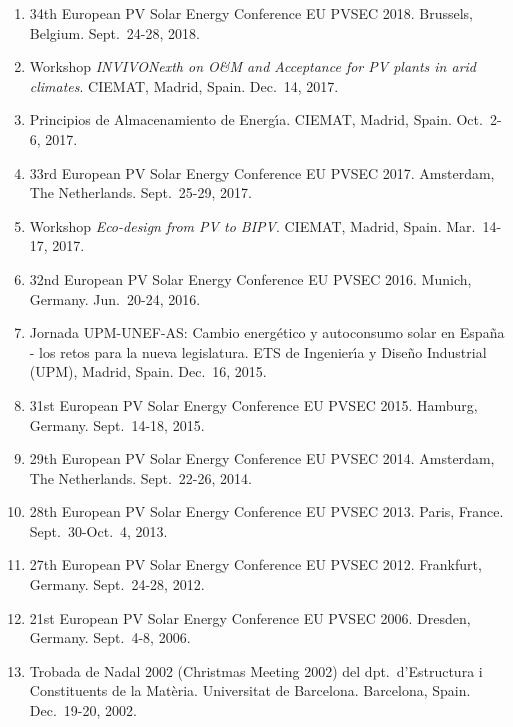 \documentclass{article}
\begin{document}
\begin{enumerate}
\item
34th European PV Solar Energy Conference EU PVSEC 2018.
Brussels, Belgium.
Sept.~24-28, 2018.

\item
Workshop {\it INVIVONexth on O\&M and Acceptance for PV plants in arid climates}.
CIEMAT, Madrid, Spain.
Dec.~14, 2017. 

\item
Principios de Almacenamiento de Energ{\'\i}a.
CIEMAT, Madrid, Spain.
Oct.~2-6, 2017. 

\item
33rd European PV Solar Energy Conference EU PVSEC 2017.
Amsterdam, The Netherlands.
Sept.~25-29, 2017.

\item
Workshop {\it Eco-design from PV to BIPV}.
CIEMAT, Madrid, Spain.
Mar.~14-17, 2017. 

\item
32nd European PV Solar Energy Conference EU PVSEC 2016.
Munich, Germany.
Jun.~20-24, 2016.

\item
Jornada UPM-UNEF-AS:  Cambio energ\'etico y autoconsumo solar en Espa\~na - los retos para la nueva legislatura.
ETS de Ingenier{\'\i}a y Dise\~no Industrial (UPM), Madrid, Spain.
Dec.~16, 2015. 

\item
31st European PV Solar Energy Conference EU PVSEC 2015.
Hamburg, Germany.
Sept.~14-18, 2015.

\item
29th European PV Solar Energy Conference EU PVSEC 2014.
Amsterdam, The Netherlands.
Sept.~22-26, 2014.

\item
28th European PV Solar Energy Conference EU PVSEC 2013.
Paris, France.
Sept.~30-Oct.~4, 2013.

\item
27th European PV Solar Energy Conference EU PVSEC 2012.
Frankfurt, Germany.
Sept.~24-28, 2012.

\item
21st European PV Solar Energy Conference EU PVSEC 2006.
Dresden, Germany.
Sept.~4-8, 2006.

\item
Trobada de Nadal 2002 (Christmas Meeting 2002) del dpt.~d'Estructura 
i Constituents de la Mat\`eria. 
Universitat de Barcelona.
Barcelona, Spain.
Dec.~19-20, 2002.


\end{enumerate}
\end{document}
